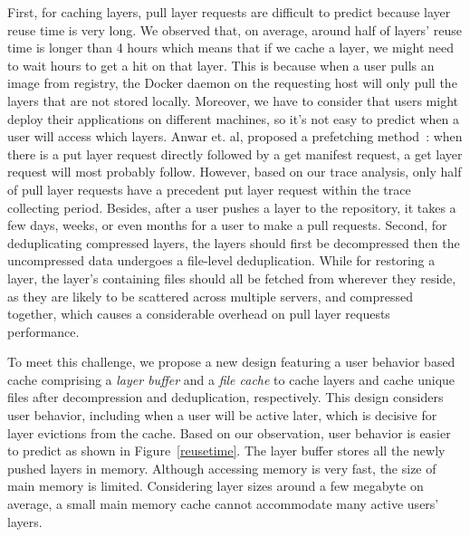 First, for caching layers, pull layer requests are difficult to predict because layer reuse time is very long. 
We observed that, on average, around half of layers' reuse time is longer than 4 hours which means 
that if we cache a layer, we might need to wait hours to get a hit on that layer.
This is because when a user pulls an image from registry, the Docker daemon on the requesting host will only pull the layers that are not stored locally. 
Moreover, we have to consider that users might deploy their applications on different machines, so it's not easy to predict 
when a user will access which layers.
Anwar et. al, proposed a prefetching method~\cite{anwarfast}: when there is a put layer request directly followed by a get manifest request, a get layer request will most probably follow.
However, based on our trace analysis, only half of pull layer requests have a precedent put layer request within the trace collecting period. Besides,
after a user pushes a layer to the repository, it takes a few days, weeks, or even months for a user to make a pull requests.
Second, for deduplicating compressed layers, the layers should first be decompressed then the uncompressed data undergoes a file-level deduplication. While for restoring a layer, the layer's
containing files should all be fetched from wherever they reside, as they are likely to be scattered across multiple servers, and compressed together, which causes a considerable overhead on pull layer requests performance.

To meet this challenge, we propose a new design featuring a user behavior based cache comprising a \emph{layer buffer} and a
\emph{file cache} to cache layers and cache unique files after decompression and deduplication, respectively.
This design considers user behavior, including when a user will be active later, which is decisive for layer evictions from the cache.
Based on our observation, user behavior is easier to predict as shown in Figure~\ref{reusetime}.
The layer buffer stores all the newly pushed layers in memory. 
Although accessing memory is very fast, the size of main memory is limited. 
Considering layer sizes around a few megabyte on average, a small main memory cache cannot accommodate many active users' layers.

